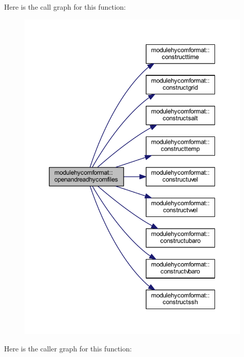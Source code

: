 Here is the call graph for this function\+:\nopagebreak
\begin{figure}[H]
\begin{center}
\leavevmode
\includegraphics[width=345pt]{namespacemodulehycomformat_acba9e941ba6903be2a19cdc9e036cd64_cgraph}
\end{center}
\end{figure}
Here is the caller graph for this function\+:\nopagebreak
